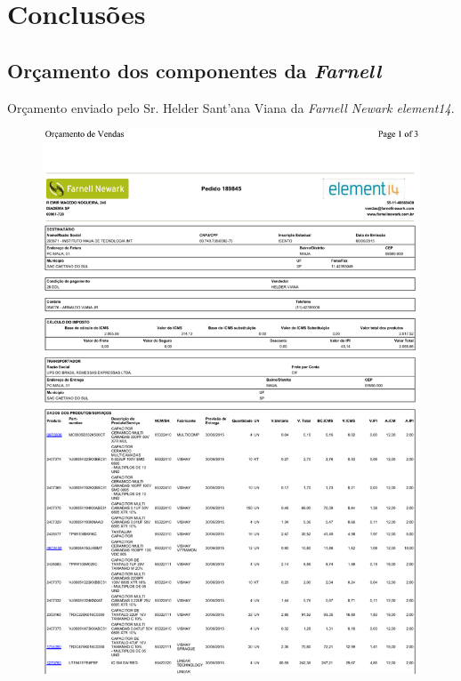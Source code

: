 \documentclass[
	12pt,				%
	openright,			%
	oneside,			%
	a4paper,			%
	english,			%
	french,				%
	spanish,			%
	brazil,				%
	oldfontcommands
	]{abntex2}
\begin{document}
\chapter[Conclusões]{Conclusões}





\begin{anexosenv}

\partanexos

\chapter[Orçamento dos componentes da Farnell]{Orçamento dos componentes da \textit{Farnell}}

	Orçamento enviado pelo Sr. Helder Sant'ana Viana da \textit{Farnell Newark element14}.

	\begin{figure}[th]
		\centering
		\includegraphics[width=0.85\linewidth]{./anexos/Pedido189845}	
	\end{figure}
	

\end{anexosenv}
\end{document}
